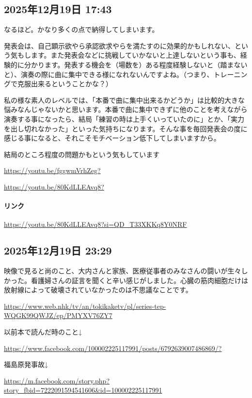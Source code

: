 \subsection*{2025年12月19日 17:43}

なるほど。かなり多くの点で納得してしまいます。

発表会は、自己顕示欲やら承認欲求やらを満たすのに効果的かもしれない、という気もします。また発表会などに挑戦していかないと上達しないという事も、経験的に分かります。発表する機会を（場数を）ある程度経験しないと（踏まないと）、演奏の際に曲に集中できる様になれないんですよね。（つまり、トレーニングで克服出来るということかな？）

私の様な素人のレベルでは、「本番で曲に集中出来るかどうか」は比較的大きな悩みなんじゃないかと思います。本番で曲に集中できずに他のことを考えながら演奏する事になったら、結局「練習の時は上手くいっていたのに」とか、「実力を出し切れなかった」といった気持ちになります。そんな事を毎回発表会の度に感じる事になると、それこそモチベーション低下してしまいますから。

結局のところ程度の問題かもという気もしています

\url{https://youtu.be/fggwmVrhZeg?}

\url{https://youtu.be/80KdLLEAvq8?}

\paragraph{リンク}
\url{https://youtu.be/80KdLLEAvq8?si=QD_T33XKKq8Y0NRF}

\subsection*{2025年12月19日 23:29}

映像で見ると尚のこと、大内さんと家族、医療従事者のみなさんの闘いが生々しかった。看護婦さんの証言を聞くと辛い感じがしました。心臓の筋肉細胞だけは放射線によって破壊されていなかったのは不思議なことです。

\url{https://www.web.nhk/tv/an/tokikaketv/pl/series-tep-WQGK99QWJZ/ep/PMYXV76ZY7}

以前本で読んだ時のこと↓

\url{https://www.facebook.com/100002225117991/posts/6792639007486869/?}

福島原発事故↓

\url{https://m.facebook.com/story.php?story_fbid=7222091594541606&id=100002225117991}

